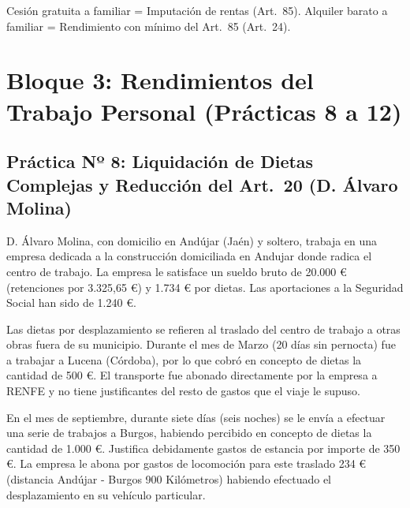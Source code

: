 \documentclass[11pt,a4paper,openany]{article}
\begin{document}
\begin{resultadoBox}
Cesión gratuita a familiar = Imputación de rentas (Art.~85). Alquiler barato a familiar = Rendimiento con mínimo del Art.~85 (Art.~24).
\end{resultadoBox}

\newpage

\section{Bloque 3: Rendimientos del Trabajo Personal (Prácticas 8 a 12)}

\subsection{Práctica Nº 8: Liquidación de Dietas Complejas y Reducción del Art.~20 (D. Álvaro Molina)}

\begin{enunciadoBox}
D. Álvaro Molina, con domicilio en Andújar (Jaén) y soltero, trabaja en una empresa dedicada a la construcción domiciliada en Andujar donde radica el centro de trabajo. La empresa le satisface un sueldo bruto de 20.000 \euro{} (retenciones por 3.325,65 \euro{}) y 1.734 \euro{} por dietas. Las aportaciones a la Seguridad Social han sido de 1.240 \euro{}.

Las dietas por desplazamiento se refieren al traslado del centro de trabajo a otras obras fuera de su municipio. Durante el mes de Marzo (20 días sin pernocta) fue a trabajar a Lucena (Córdoba), por lo que cobró en concepto de dietas la cantidad de 500 \euro{}. El transporte fue abonado directamente por la empresa a RENFE y no tiene justificantes del resto de gastos que el viaje le supuso.

En el mes de septiembre, durante siete días (seis noches) se le envía a efectuar una serie de trabajos a Burgos, habiendo percibido en concepto de dietas la cantidad de 1.000 \euro{}. Justifica debidamente gastos de estancia por importe de 350 \euro{}. La empresa le abona por gastos de locomoción para este traslado 234 \euro{} (distancia Andújar - Burgos 900 Kilómetros) habiendo efectuado el desplazamiento en su vehículo particular.
\end{enunciadoBox}
\end{document}
